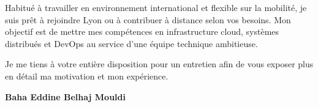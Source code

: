 \documentclass[a4paper,11pt]{article}
\begin{document}
Habitué à travailler en environnement international et flexible sur la mobilité, je suis prêt à rejoindre Lyon ou à contribuer à distance selon vos besoins. Mon objectif est de mettre mes compétences en infrastructure cloud, systèmes distribués et DevOps au service d'une équipe technique ambitieuse.

Je me tiens à votre entière disposition pour un entretien afin de vous exposer plus en détail ma motivation et mon expérience.

\vspace{0.8cm}

\begin{flushright}
{\bfseries Baha Eddine Belhaj Mouldi}
\end{flushright}
\end{document}
